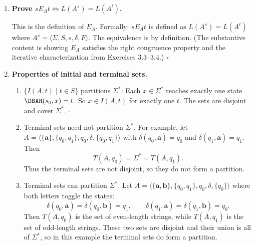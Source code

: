 \begin{enumerate}[{3.}1.]
The chain
\[
C_0\subseteq C_1\subseteq C_2\subseteq\cdots\subseteq S^c
\]
can gain a new state at most $\|S\|$ times, since there are only $\|S\|$ states
altogether. Hence for some $i\leq \|S\|$ we have $C_i=C_{i+1}$, and then no new
reachable states ever appear. Therefore $C_i=S^c$ for some $i\leq \|S\|$.

Thus every connected state has the form $\DBAR(s_0,x)$ for some word with
$|x|\leq \|S\|$, so
\[
S^c\subseteq\{\DBAR(s_0,x)\mid |x|\leq\|S\|\}.
\]
The reverse inclusion is immediate, because every state reached from $s_0$ by a
word is connected. Therefore
\[
S^c=\{\DBAR(s_0,x)\mid |x|\leq\|S\|\}. \qed
\]

\item \textbf{Prove $s E_A t\Leftrightarrow L(A^s)=L(A^t)$.}

This is the definition of $E_A$. Formally: $s E_A t$ is defined as $L(A^s)=L(A^t)$ where $A^s=\langle\Sigma,S,s,\delta,F\rangle$. The equivalence is by definition. (The substantive content is showing $E_A$ satisfies the right congruence property and the iterative characterization from Exercises 3.3--3.4.) $\square$

\item \textbf{Properties of initial and terminal sets.}

\begin{enumerate}
\item $\{I(A,t)\mid t\in S\}$ partitions $\Sigma^*$: Each $x\in\Sigma^*$ reaches exactly one state $\DBAR(s_0,x)=t$. So $x\in I(A,t)$ for exactly one $t$. The sets are disjoint and cover $\Sigma^*$. $\square$

\item Terminal sets need not partition $\Sigma^*$. For example, let
$A=\langle\{\pmb{a}\},\{q_0,q_1\},q_0,\delta,\{q_0,q_1\}\rangle$ with
$\delta(q_0,\pmb{a})=q_0$ and $\delta(q_1,\pmb{a})=q_1$. Then
\[
T(A,q_0)=\Sigma^*=T(A,q_1).
\]
Thus the terminal sets are not disjoint, so they do not form a partition.

\item Terminal sets can partition $\Sigma^*$. Let
$A=\langle\{\pmb{a},\pmb{b}\},\{q_0,q_1\},q_0,\delta,\{q_0\}\rangle$ where both
letters toggle the states:
\[
\delta(q_0,\pmb{a})=\delta(q_0,\pmb{b})=q_1,\qquad
\delta(q_1,\pmb{a})=\delta(q_1,\pmb{b})=q_0.
\]
Then $T(A,q_0)$ is the set of even-length strings, while $T(A,q_1)$ is the set
of odd-length strings. These two sets are disjoint and their union is all of
$\Sigma^*$, so in this example the terminal sets do form a partition.
\end{enumerate}

\end{enumerate}

